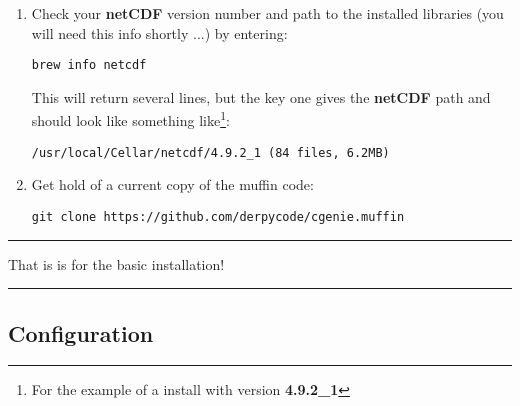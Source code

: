 \documentclass[10pt,twoside]{article}
\begin{document}
\begin{enumerate}[noitemsep]
\vspace{1mm}
\item Check your \textbf{netCDF} version number and path to the installed libraries (you will need this info shortly ...) by entering:
\vspace{-2pt}
\begin{verbatim}
brew info netcdf
\end{verbatim}
\vspace{-2pt}
This will return several lines, but the key one gives the \textbf{netCDF} path and should look like something like\footnote{For the example of a install with version \textbf{4.9.2\_1}}:
\vspace{-2pt}
\begin{verbatim}
/usr/local/Cellar/netcdf/4.9.2_1 (84 files, 6.2MB)
\end{verbatim}
\vspace{-2pt}

\vspace{1mm}
\item Get hold of a current copy of the muffin code:
\vspace{-2pt}
\begin{verbatim}
git clone https://github.com/derpycode/cgenie.muffin
\end{verbatim}
\vspace{-2pt}

\end{enumerate}

\vspace{-1mm}\noindent\rule{4cm}{0.1mm}

\noindent That is is for the basic installation!

\vspace{-1mm}\noindent\rule{4cm}{0.1mm}

\subsection{Configuration}
\end{document}
